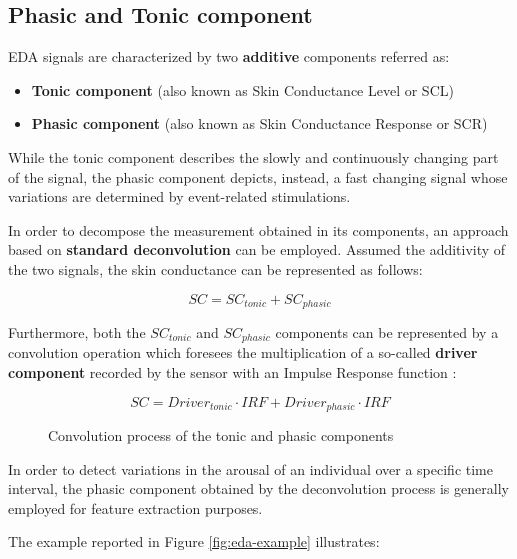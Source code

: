 \subsection{Phasic and Tonic component}\label{subsec:phasic-tonic}

EDA signals are characterized by two \textbf{additive} components \cite{eda-guide} referred as:

\begin{itemize}
    \item \textbf{Tonic component} (also known as Skin Conductance Level or SCL)
    \item \textbf{Phasic component} (also known as Skin Conductance Response or SCR)
\end{itemize}

While the tonic component describes the slowly and continuously changing part of the signal, the phasic component depicts, instead, a fast changing signal whose variations are determined by event-related stimulations.

In order to decompose the measurement obtained in its components, an approach based on \textbf{standard deconvolution} can be employed. Assumed the additivity of the two signals, the skin conductance can be represented as follows:

\begin{equation}
    SC = SC_{tonic} + SC_{phasic}
\end{equation}

Furthermore, both the $SC_{tonic}$ and $SC_{phasic}$ components can be represented by a convolution operation which foresees the multiplication of a so-called \textbf{driver component} recorded by the sensor with an Impulse Response function \cite{edasvm}:

\vspace{5mm}

\begin{figure}[H]
\begin{equation}
SC = Driver_{tonic} \cdot IRF + Driver_{phasic} \cdot IRF
\end{equation}
\caption{Convolution process of the tonic and phasic components}
\label{fig:eda-convolution}
\end{figure}

In order to detect variations in the arousal of an individual over a specific time interval, the phasic component obtained by the deconvolution process is generally employed for feature extraction purposes.

The example reported in Figure \ref{fig:eda-example} illustrates:

